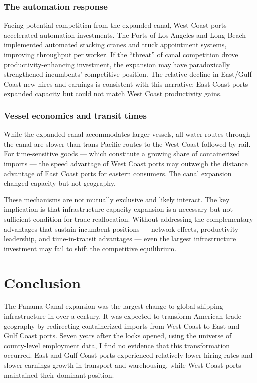 \documentclass[12pt]{article}
\begin{document}
\subsubsection*{The automation response} Facing potential competition from the expanded canal, West Coast ports accelerated automation investments. The Ports of Los Angeles and Long Beach implemented automated stacking cranes and truck appointment systems, improving throughput per worker. If the ``threat'' of canal competition drove productivity-enhancing investment, the expansion may have paradoxically strengthened incumbents' competitive position. The relative decline in East/Gulf Coast new hires and earnings is consistent with this narrative: East Coast ports expanded capacity but could not match West Coast productivity gains.

\subsubsection*{Vessel economics and transit times} While the expanded canal accommodates larger vessels, all-water routes through the canal are slower than trans-Pacific routes to the West Coast followed by rail. For time-sensitive goods --- which constitute a growing share of containerized imports --- the speed advantage of West Coast ports may outweigh the distance advantage of East Coast ports for eastern consumers. The canal expansion changed capacity but not geography.

These mechanisms are not mutually exclusive and likely interact. The key implication is that infrastructure capacity expansion is a necessary but not sufficient condition for trade reallocation. Without addressing the complementary advantages that sustain incumbent positions --- network effects, productivity leadership, and time-in-transit advantages --- even the largest infrastructure investment may fail to shift the competitive equilibrium.

\section{Conclusion}

The Panama Canal expansion was the largest change to global shipping infrastructure in over a century. It was expected to transform American trade geography by redirecting containerized imports from West Coast to East and Gulf Coast ports. Seven years after the locks opened, using the universe of county-level employment data, I find no evidence that this transformation occurred. East and Gulf Coast ports experienced relatively lower hiring rates and slower earnings growth in transport and warehousing, while West Coast ports maintained their dominant position.
\end{document}
